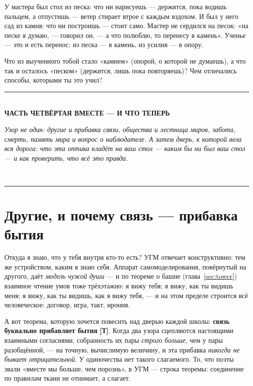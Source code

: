 \documentclass[11pt,letterpaper]{article}
\newcommand{\stT}{\textbf{[Т]}\xspace}
\newcommand{\partline}[2]{%
  \clearpage\vspace*{4pt}\begin{center}
  {\color{fact}\rule{0.55\textwidth}{0.4pt}}\\[9pt]
  {\large\bfseries #1}\\[7pt]
  \begin{minipage}{0.82\textwidth}\centering\small\itshape\color{plosgray} #2\end{minipage}\\[9pt]
  {\color{fact}\rule{0.55\textwidth}{0.4pt}}
  \end{center}\bigskip}
\begin{document}
\begin{skazbox}
У мастера был стол из песка: что ни нарисуешь --- держится, пока
водишь пальцем, а отпустишь --- ветер стирает втрое с каждым вздохом.
И был у него сад из камня: что ни построишь --- стоит само. Мастер
не сердился на песок: «на песке я думаю, --- говорил он, --- а что
полюблю, то перенесу в камень». Ученье --- это и есть перенос: из
песка --- в камень, из усилия --- в опору.
\end{skazbox}

\begin{askbox}
Что из выученного тобой стало «камнем» (опорой, о которой не
думаешь), а что так и осталось «песком» (держится, лишь пока
повторяешь)? Чем отличались способы, которыми ты это учил?
\end{askbox}

\partline{ЧАСТЬ ЧЕТВЁРТАЯ \;\textperiodcentered\; ВМЕСТЕ --- И ЧТО ТЕПЕРЬ}{Узор не
один: другие и прибавка связи, общества и лестница миров, забота, смерть, память мира и
вопрос о наблюдателе. А затем дверь, к которой вела вся дорога: что эта оптика кладёт на ваш
стол --- каким бы ни был ваш стол --- и как проверить, что всё это правда.}

\section{Другие, и почему связь --- прибавка бытия}
\label{sec:others}

Откуда я знаю, что у тебя внутри кто-то есть? УГМ отвечает
конструктивно: тем же устройством, каким я знаю себя. Аппарат
самомоделирования, повёрнутый на другого, даёт \emph{модель чужой
души} --- и по теореме о башне (глава~\ref{sec:tower}) взаимное
чтение умов тоже трёхэтажно: я вижу тебя; я вижу, как ты видишь
меня; я вижу, как ты видишь, как я вижу тебя, --- и на этом
пределе строится всё человеческое: договор, игра, такт, ирония.

А вот теорема, которую хочется повесить над дверью каждой школы:
\textbf{связь буквально прибавляет бытия} \stT. Когда два узора
сцепляются настоящими взаимными согласиями, собранность их пары
\emph{строго больше}, чем у пары разобщённой, --- на точную,
вычислимую величину, и эта прибавка \emph{никогда не бывает
отрицательной}. У одиночества нет такого слагаемого. То, что
поэты звали «вместе мы больше, чем порознь», в УГМ --- строка
теоремы: соединение по правилам ткани не отнимает, а слагает.
\end{document}
